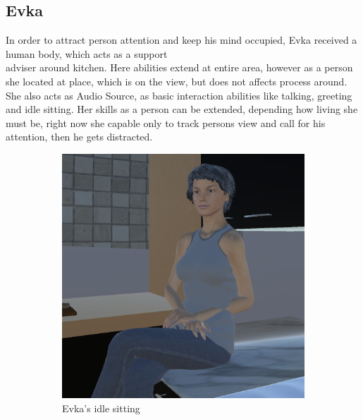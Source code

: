 \documentclass[18pt]{article}
\numberwithin{equation}{section} %
\numberwithin{figure}{section} %
\numberwithin{table}{section} %
\begin{document}
	\subsection{Evka}
	In order to attract person attention and keep his mind occupied, Evka received a human body, which acts as a support\\adviser around kitchen. Here abilities extend at entire area, however as a person she located at place, which is on the view, but does not affects process around. She also acts as Audio Source, as basic interaction abilities like talking, greeting and idle sitting. Her skills as a person can be extended, depending how living she must be, right now she capable only to track persons view and call for his attention, then he gets distracted. \\
	\begin{figure}[H]
		\centering
		\begin{subfigure}{0.4\textwidth}
			\centering
			\includegraphics[width=1\linewidth]{images/Evka_sit_1}
			\caption{Evka's idle sitting}
		\end{subfigure}
		\begin{subfigure}{0.4\textwidth}
			\centering

\end{subfigure}
\end{figure}
\end{document}

